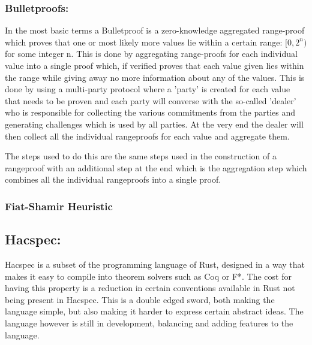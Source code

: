 \documentclass{article}
\begin{document}
\subsubsection{Bulletproofs:}

In the most basic terms a Bulletproof is a zero-knowledge aggregated range-proof which proves that one or most likely more values lie within a certain range: $[0,2^n)$ for some integer n. This is done by aggregating range-proofs for each individual value into a single proof which, if verified proves that each value given lies within the range while giving away no more information about any of the values. This is done by using a multi-party protocol where a 'party' is created for each value that needs to be proven and each party will converse with the so-called 'dealer' who is responsible for collecting the various commitments from the parties and generating challenges which is used by all parties. At the very end the dealer will then collect all the individual rangeproofs for each value and aggregate them. 

The steps used to do this are the same steps used in the construction of a rangeproof with an additional step at the end which is the aggregation step which combines all the individual rangeproofs into a single proof.

\subsubsection{Fiat-Shamir Heuristic}\label{fiat-shamir-heuristic}

\subsection{Hacspec:} \label{Hacspec}

Hacspec is a subset of the programming language of Rust, designed in a
way that makes it easy to compile into theorem solvers such as Coq or F*.
The cost for having this property is a reduction in certain conventions
available in Rust not being present in Hacspec. This is a double edged
sword, both making the language simple, but also making it harder to
express certain abstract ideas. The language however is still in
development, balancing and adding features to the language.
\end{document}
